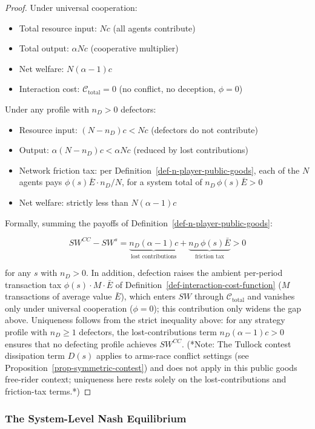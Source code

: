 \documentclass[11pt]{article}
\theoremstyle{plain}
\theoremstyle{definition}
\theoremstyle{remark}
\let\origsubsubsection\subsubsection
\renewcommand{\subsubsection}{\needspace{4\baselineskip}\origsubsubsection}
\begin{document}
\begin{proof}
Under universal cooperation:
\begin{itemize}
\item Total resource input: $Nc$ (all agents contribute)
\item Total output: $\alpha N c$ (cooperative multiplier)
\item Net welfare: $N(\alpha - 1)c$
\item Interaction cost: $\mathcal{C}_{\text{total}} = 0$ (no conflict, no deception, $\phi = 0$)
\end{itemize}
Under any profile with $n_D > 0$ defectors:
\begin{itemize}
\item Resource input: $(N - n_D)c < Nc$ (defectors do not contribute)
\item Output: $\alpha(N - n_D)c < \alpha Nc$ (reduced by lost contributions)
\item Network friction tax: per Definition~\ref{def-n-player-public-goods}, each of the $N$ agents pays $\phi(s) \bar{E} \cdot n_D / N$, for a system total of $n_D \, \phi(s) \bar{E} > 0$
\item Net welfare: strictly less than $N(\alpha - 1)c$
\end{itemize}
Formally, summing the payoffs of Definition~\ref{def-n-player-public-goods}:

$$SW^{CC} - SW^{s} = \underbrace{n_D (\alpha - 1)c}_{\text{lost contributions}} + \underbrace{n_D \, \phi(s) \bar{E}}_{\text{friction tax}} > 0$$

for any $s$ with $n_D > 0$. In addition, defection raises the ambient per-period transaction tax $\phi(s) \cdot M \cdot \bar{E}$ of Definition~\ref{def-interaction-cost-function} ($M$ transactions of average value $\bar{E}$), which enters $SW$ through $\mathcal{C}_{\text{total}}$ and vanishes only under universal cooperation ($\phi = 0$); this contribution only widens the gap above. Uniqueness follows from the strict inequality above: for any strategy profile with $n_D \geq 1$ defectors, the lost-contributions term $n_D(\alpha - 1)c > 0$ ensures that no defecting profile achieves $SW^{CC}$. (*Note: The Tullock contest dissipation term $D(s)$ applies to arms-race conflict settings (see Proposition~\ref{prop-symmetric-contest}) and does not apply in this public goods free-rider context; uniqueness here rests solely on the lost-contributions and friction-tax terms.*)
\end{proof}

\subsubsection{The System-Level Nash
Equilibrium}\label{the-system-level-nash-equilibrium}
\end{document}
